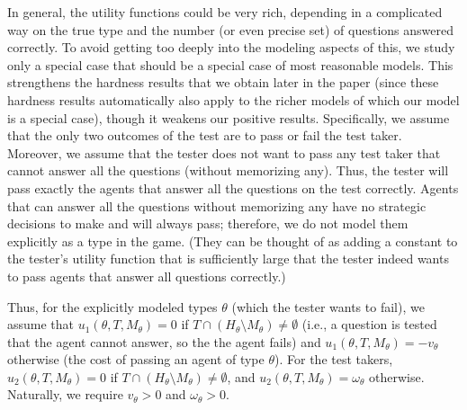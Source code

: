 \documentclass{article}
\begin{document}
In general, the utility functions could be very rich, depending in a
complicated way on the true type and the number (or even precise set) of
questions answered correctly.  To avoid getting too deeply into the
modeling aspects of this, we study only a special case that should be a
special case of most reasonable models.  This strengthens the hardness
results that we obtain later in the paper (since these hardness results
automatically also apply to the richer models of which our model is a
special case), though it weakens our positive results.  Specifically, we
assume that the only two outcomes of the test are to pass or fail the test
taker.  Moreover, we assume that the tester does not want to pass any test
taker that cannot answer all the questions (without memorizing any).  Thus,
the tester will pass exactly the agents that answer all the questions on
the test correctly.  Agents that can answer all the questions without
memorizing any have no strategic decisions to make and will always pass;
therefore, we do not model them explicitly as a type in the game.  (They
can be thought of as adding a constant to the tester's utility function
that is sufficiently large that the tester indeed wants to pass agents that
answer all questions correctly.)  

Thus, for the explicitly modeled types
$\theta$ (which the tester wants to fail), we assume that $u_1(\theta, T,
M_\theta) = 0$ if $T \cap (H_\theta \setminus M_\theta) \neq \emptyset$
(i.e., a question is tested that the agent cannot answer, so the 
the agent fails) and $u_1(\theta, T, M_\theta) = -v_\theta$ otherwise
(the cost of passing an agent of type $\theta$).  For the test takers,
$u_2(\theta, T,
M_\theta) = 0$ if $T \cap (H_\theta \setminus M_\theta) \neq \emptyset$,
and $u_2(\theta, T, M_\theta) = \omega_\theta$ otherwise.  Naturally, we require
$v_\theta >0$ and $\omega_\theta>0$.


\end{document}
